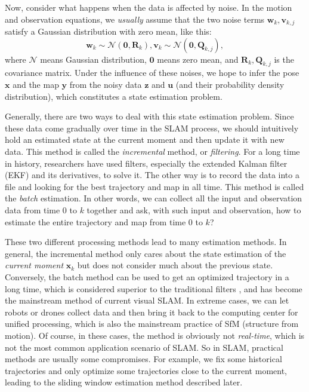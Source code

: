 Now, consider what happens when the data is affected by noise. In the motion and observation equations, we \textit {usually} assume that the two noise terms $ \mathbf {w} _k, \mathbf {v} _ {k, j} $ satisfy a Gaussian distribution with zero mean, like this:
\begin{equation}
{\mathbf{w}_k} \sim \mathcal{N}\left( {\mathbf{0},{\mathbf{R}_k}} \right),{\mathbf{v}_k} \sim \mathcal{N}\left( {\mathbf{0},{{{\mathbf{Q}}}_{k,j}}} \right),
\end{equation}
where $ \mathcal {N} $ means Gaussian distribution, $ \mathbf{0} $ means zero mean, and $ \mathbf {R} _k, \mathbf {Q} _ {k, j} $ is the covariance matrix. Under the influence of these noises, we hope to infer the pose $ \mathbf {x} $ and the map $ \mathbf {y} $ from the noisy data $ \mathbf {z} $ and $ \mathbf {u} $ (and their probability density distribution), which constitutes a state estimation problem.

Generally, there are two ways to deal with this state estimation problem. Since these data come gradually over time in the SLAM process, we should intuitively hold an estimated state at the current moment and then update it with new data. This method is called the \textit {incremental} method, or \textit{filtering}. For a long time in history, researchers have used filters, especially the extended Kalman filter (EKF) and its derivatives, to solve it. The other way is to record the data into a file and looking for the best trajectory and map in all time. This method is called the \textit {batch} estimation. In other words, we can collect all the input and observation data from time 0 to $ k $ together and ask, with such input and observation, how to estimate the entire trajectory and map from time 0 to $ k $?

These two different processing methods lead to many estimation methods. In general, the incremental method only cares about the state estimation of the \textit {current moment} $ \mathbf {x} _k $ but does not consider much about the previous state. Conversely, the batch method can be used to get an optimized trajectory in a long time, which is considered superior to the traditional filters \cite {Strasdat2012}, and has become the mainstream method of current visual SLAM. In extreme cases, we can let robots or drones collect data and then bring it back to the computing center for unified processing, which is also the mainstream practice of SfM (structure from motion). Of course, in these cases, the method is obviously not \textit {real-time}, which is not the most common application scenario of SLAM. So in SLAM, practical methods are usually some compromises. For example, we fix some historical trajectories and only optimize some trajectories close to the current moment, leading to the sliding window estimation method described later.

